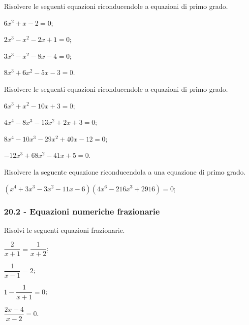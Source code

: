 \begin{esercizio}[\Ast]
\label{ese:20.12}
Risolvere le seguenti equazioni riconducendole a equazioni di primo grado.
\begin{multicols}{2}
\begin{enumeratea}
 \item $6x^{2}+x-2=0$;
 \item $2x^{3}-x^{2}-2x+1=0$;
 \item $3x^{3}-x^{2}-8x-4=0$;
 \item $8x^{3}+6x^{2}-5x-3=0$.
\end{enumeratea}
\end{multicols}
\end{esercizio}

\begin{esercizio}[\Ast]
\label{ese:20.13}
Risolvere le seguenti equazioni riconducendole a equazioni di primo grado.
\begin{multicols}{2}
\begin{enumeratea}
 \item $6x^{3}+x^{2}-10x+3=0$;
 \item $4x^{4}-8x^{3}-13x^{2}+2x+3=0$;
 \item $8x^{4}-10x^{3}-29x^{2}+40x-12=0$;
 \item $-12x^{3}+68x^{2}-41x+5=0$.
\end{enumeratea}
\end{multicols}
\end{esercizio}

\begin{esercizio}[\Ast]
\label{ese:20.14}
Risolvere la seguente equazione riconducendola a una equazione di primo grado.

$(x^{4}+3x^{3}-3x^{2}-11x-6)(4x^{6}-216x^{3}+2916)=0$;
\end{esercizio}

\subsubsection*{20.2 - Equazioni numeriche frazionarie}

\begin{esercizio}[\Ast]
\label{ese:20.15}
Risolvi le seguenti equazioni frazionarie.
\begin{multicols}{2}
\begin{enumeratea}
 \item $\dfrac{2}{x+1}=\dfrac{1}{x+2}$;
 \item $\dfrac{1}{x-1}=2$;
 \item $1-\dfrac{1}{x+1}=0$;
 \item $\dfrac{2x-4}{x-2}=0$.
\end{enumeratea}
\end{multicols}
\end{esercizio}

